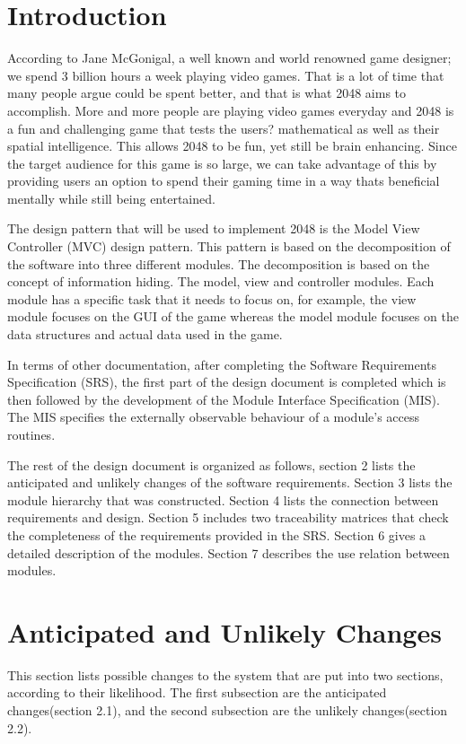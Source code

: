 \documentclass[12pt]{article}
\begin{document}
\section{Introduction}
According to Jane McGonigal, a well known and world renowned game 
designer; we spend 3 billion hours a week playing video games. That is a lot of 
time that many people argue could be spent better, and that is what 2048 aims to 
accomplish. More and more people are playing video games everyday and 
2048 is a fun and challenging game that tests the users? mathematical as well as 
their spatial intelligence. This allows 2048 to be fun, yet still be brain 
enhancing. Since the target audience for this game is so large, we can take 
advantage of this by providing users an option to spend their gaming time in a way 
thats beneficial mentally while still being entertained. \par
The design pattern that will be used to implement 2048 is the Model View Controller (MVC) design pattern. This pattern is based on the decomposition of the software into three different modules. The decomposition is based on the concept of information hiding. The model, view and controller modules. Each module has a specific task that it needs to focus on, for example, the view module focuses on the GUI of the game whereas the model module focuses on the data structures and actual data used in the game. \par
In terms of other documentation, after completing the Software Requirements Specification (SRS), the first part of the design document is completed which is then followed by the development of the Module Interface Specification (MIS). The MIS specifies the externally observable behaviour of a module's access routines. \par
The rest of the design document is organized as follows, section 2 lists the anticipated and unlikely changes of the software requirements. Section 3 lists the module hierarchy that was constructed. Section 4 lists the connection between requirements and design. Section 5 includes two traceability matrices that check the completeness of the requirements provided in the SRS. Section 6 gives a detailed description of the modules. Section 7 describes the use relation between modules. 

\section{Anticipated and Unlikely Changes}
This section lists possible changes to the system that are put into two sections, according to their likelihood. The first subsection are the anticipated changes(section 2.1), and the second subsection are the unlikely changes(section 2.2).
\end{document}
